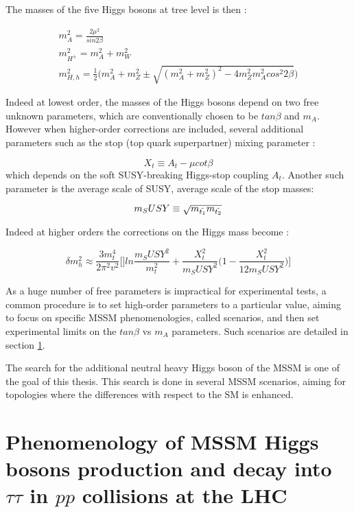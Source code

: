 The masses of the five Higgs bosons at tree level is then :

\begin{multline}
    m_{A}^2 = \frac{2\mu^2}{sin 2\beta} \\
    m_{H^{\pm}}^2 = m_{A}^2 + m_{W}^2 \\
    m_{H,h}^2 = \frac{1}{2} \big( m_A^2 + m_Z^2 \pm \sqrt{(m_A^2 + m_Z^2)^2 - 4m_Z^2 m_A^2 cos^2 2\beta} \big)
\end{multline}

Indeed at lowest order, the masses of the Higgs bosons depend on two free unknown parameters, which are conventionally chosen to be $tan \beta$ and $m_A$. However when higher-order corrections are included, several additional parameters such as the stop (top quark superpartner) mixing parameter :

\begin{equation}
    X_t \equiv A_t - \mu cot\beta
\end{equation}
which depends on the soft SUSY-breaking Higgs-stop coupling $A_t$. Another such parameter is the average scale of SUSY, average scale of the stop masses:

\begin{equation}
    m_SUSY \equiv \sqrt{m_{\Tilde{t_1}}m_{\Tilde{t_2}}}
\end{equation}

Indeed at higher orders the corrections on the Higgs mass become \cite{Nagashima:2014tva} :

\begin{equation}
    \delta m_h^2 \approx \frac{3 m_t^4}{2\pi^2 v^2} \Big[] ln\frac{m_SUSY^2}{m_t^2} + \frac{X_t^2}{m_SUSY^2} \big( 1 - \frac{X_t^2}{12 m_SUSY^2} \big) \Big]
\end{equation}

As a huge number of free parameters is impractical for experimental tests, a common procedure is to set high-order parameters to a particular value, aiming to focus on specific MSSM phenomenologies, called scenarios, and then set experimental limits on the $tan \beta$ vs $m_A$ parameters. Such scenarios  are detailed in section \ref{sec:pheno}.

The search for the additional neutral heavy Higgs boson of the MSSM is one of the goal of this thesis. This search is done in several MSSM scenarios, aiming for topologies where the differences with respect to the SM is enhanced. 

\section{Phenomenology of MSSM Higgs bosons production and decay into $\tau\tau$ in $pp$ collisions at the LHC}
\label{sec:pheno}

